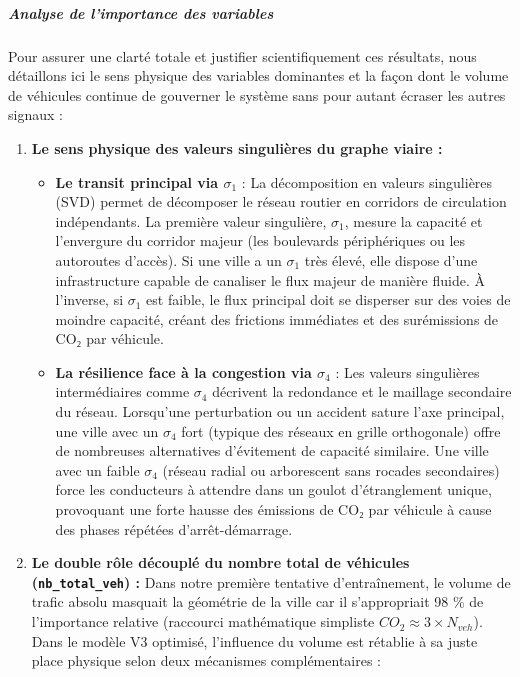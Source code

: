\documentclass[10pt, a4paper]{article}
\providecommand{\tightlist}{}
\begin{document}
\subparagraph{Analyse de l'importance des
variables}\label{analyse-de-limportance-des-variables}

Pour assurer une clarté totale et justifier scientifiquement ces
résultats, nous détaillons ici le sens physique des variables dominantes
et la façon dont le volume de véhicules continue de gouverner le système
sans pour autant écraser les autres signaux :

\begin{enumerate}
\def\labelenumi{\arabic{enumi}.}
\item
  \textbf{Le sens physique des valeurs singulières du graphe viaire :}

  \begin{itemize}
  \tightlist
  \item
    \textbf{Le transit principal via \(\sigma_1\)} : La décomposition en
    valeurs singulières (SVD) permet de décomposer le réseau routier en
    corridors de circulation indépendants. La première valeur
    singulière, \(\sigma_1\), mesure la capacité et l'envergure du
    corridor majeur (les boulevards périphériques ou les autoroutes
    d'accès). Si une ville a un \(\sigma_1\) très élevé, elle dispose
    d'une infrastructure capable de canaliser le flux majeur de manière
    fluide. À l'inverse, si \(\sigma_1\) est faible, le flux principal
    doit se disperser sur des voies de moindre capacité, créant des
    frictions immédiates et des surémissions de CO₂ par véhicule.
  \item
    \textbf{La résilience face à la congestion via \(\sigma_4\)} : Les
    valeurs singulières intermédiaires comme \(\sigma_4\) décrivent la
    redondance et le maillage secondaire du réseau. Lorsqu'une
    perturbation ou un accident sature l'axe principal, une ville avec
    un \(\sigma_4\) fort (typique des réseaux en grille orthogonale)
    offre de nombreuses alternatives d'évitement de capacité similaire.
    Une ville avec un faible \(\sigma_4\) (réseau radial ou arborescent
    sans rocades secondaires) force les conducteurs à attendre dans un
    goulot d'étranglement unique, provoquant une forte hausse des
    émissions de CO₂ par véhicule à cause des phases répétées
    d'arrêt-démarrage.
  \end{itemize}
\item
  \textbf{Le double rôle découplé du nombre total de véhicules
  (\texttt{nb\_total\_veh}) :} Dans notre première tentative
  d'entraînement, le volume de trafic absolu masquait la géométrie de la
  ville car il s'appropriait 98 \% de l'importance relative (raccourci
  mathématique simpliste \(CO_2 \approx 3 \times N_{veh}\)). Dans le
  modèle V3 optimisé, l'influence du volume est rétablie à sa juste
  place physique selon deux mécanismes complémentaires :


\end{enumerate}
\end{document}
